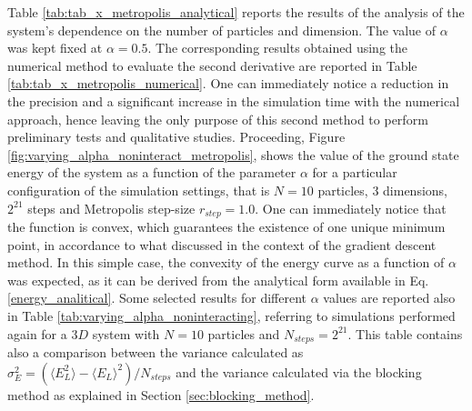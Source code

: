 Table \ref{tab:tab_x_metropolis_analytical} reports the results of the analysis of the system's dependence on the number of particles and dimension. The value of $\alpha$ was kept fixed at $\alpha = 0.5$. The corresponding results obtained using the numerical method to evaluate the second derivative are reported in Table \ref{tab:tab_x_metropolis_numerical}. One can immediately notice a reduction in the precision and a significant increase in the simulation time with the numerical approach, hence leaving the only purpose of this second method to perform preliminary tests and qualitative studies. Proceeding, Figure \ref{fig:varying_alpha_noninteract_metropolis}, shows the value of the ground state energy of the system as a function of the parameter $\alpha$ for a particular configuration of the simulation settings, that is $N=10$ particles, 3 dimensions, $2^{21}$ steps and Metropolis step-size $r_{step} = 1.0$. One can immediately notice that the function is convex, which guarantees the existence of one unique minimum point, in accordance to what discussed in the context of the gradient descent method. In this simple case, the convexity of the energy curve as a function of $\alpha$ was expected, as it can be derived from the analytical form available in Eq.\,\ref{energy_analitical}. Some selected results for different $\alpha$ values are reported also in Table \ref{tab:varying_alpha_noninteracting}, referring to simulations performed again for a $3D$ system with $N=10$ particles and $N_{steps}=2^{21}$. This table contains also a comparison between the variance calculated as $\sigma^2_E = (\langle E_L^2 \rangle - \langle E_L \rangle^2)/N_{steps}$ and the variance calculated via the blocking method as explained in Section \ref{sec:blocking_method}.

